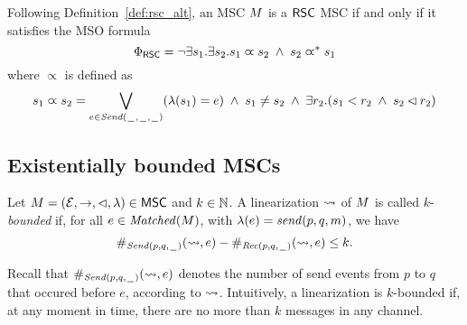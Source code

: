 \documentclass{article}
\begin{document}
Following Definition~\ref{def:rsc_alt}, an MSC $M$ is a $\mathsf{RSC}$ MSC if and only if it satisfies the MSO formula
\[
\Phi_{\mathsf{RSC}} = \neg \exists s_1.\exists s_2. s_1 \varpropto s_2 \;\wedge\; s_2 \varpropto^\ast s_1
\]
\noindent where $\varpropto$ is defined as
\[
s_1 \varpropto s_2 = 
\bigvee_{\substack{e \in {\mathit{Send}(\hspace{0.1em}\underline{\hspace{0.5em}}\hspace{0.1em},\hspace{0.1em}\underline{\hspace{0.5em}}\hspace{0.1em},\hspace{0.1em}\underline{\hspace{0.5em}}\hspace{0.1em})}}}(\lambda(s_1) = e) \;\wedge\;
s_1 \neq s_2 \;\wedge\; 
\exists r_2. (s_1 < r_2 \;\wedge\; s_2 \lhd r_2)
\]

\subsection{Existentially bounded MSCs}

\begin{definition}\label{def:lin_k_bounded}
	Let $M = (\mathcal{E},\to,\lhd,\lambda) \in \mathsf{MSC}$ and $k \in \mathbb{N}$.
	A linearization $\rightsquigarrow$ of $M$ is called
	$k$-\emph{bounded} if, for all $e \in \mathit{Matched}(M)$, with $\lambda(e) = \mathit{send}(p, q, m)$, we have 
	\[
	\#_{{\mathit{Send}(p,q,\hspace{0.1em}\underline{\hspace{0.5em}}\hspace{0.1em})}}(\rightsquigarrow,e) - \#_{{\mathit{Rec}(p,q,\hspace{0.1em}\underline{\hspace{0.5em}}\hspace{0.1em})}}(\rightsquigarrow,e) \le k.
	\]
\end{definition}
\noindent Recall that $\#_{{\mathit{Send}(p,q,\hspace{0.1em}\underline{\hspace{0.5em}}\hspace{0.1em})}}(\rightsquigarrow,e)$ denotes the number of send events from $p$ to $q$ that occured before $e$, according to $\rightsquigarrow$. Intuitively, a linearization is $k$-bounded if, at any moment in time, there are no more than $k$ messages in any channel.
\end{document}
